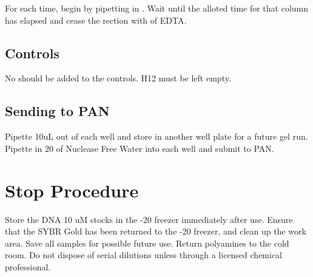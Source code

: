 \documentclass{ssiBio}
\begin{document}
For each time, begin by pipetting in . Wait until the alloted time for that column has elapsed and cease the rection with  of EDTA.

\subsection{Controls}

No \tdt{} should be added to the controls. H12 must be left empty. 

\subsection{Sending to PAN}

Pipette 10uL out of each well and store in another well plate for a future gel run. Pipette in 20\uL{} of Nuclease Free Water into each well and submit to PAN.

\section{Stop Procedure}
Store the DNA 10 uM stocks in the -20 freezer immediately after use. Ensure that the SYBR Gold has been returned to the -20 freezer, and clean up the work area. Save all samples for possible future use.
Return polyamines to the cold room. Do not dispose of serial dilutions unless through a licensed chemical professional.

\begin{comment}
\subsection{Analysis}

\begin{figure}[ht]
\centering
\texttt{[image: ./gels/Gel\_1.png]}
\label{}
\caption{Gel 1}
\end{figure}



\end{comment}
\end{document}
